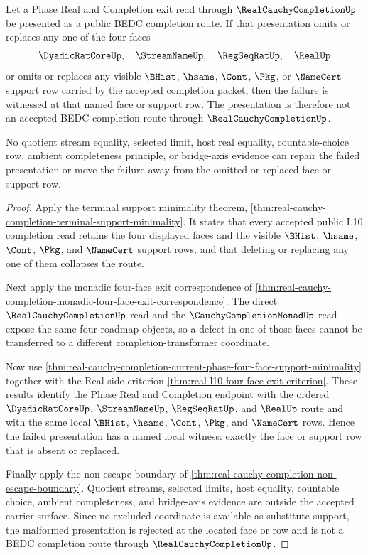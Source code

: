 \begin{theorem}
\label{thm:real-cauchy-completion-terminal-support-defect-localization}
Let a Phase Real and Completion exit read through $\RealCauchyCompletionUp$ be presented as a public BEDC completion route. If that presentation omits or replaces any one of the four faces
$$
\DyadicRatCoreUp,\quad \StreamNameUp,\quad \RegSeqRatUp,\quad \RealUp
$$
or omits or replaces any visible $\BHist$, $\hsame$, $\Cont$, $\Pkg$, or $\NameCert$ support row carried by the accepted completion packet, then the failure is witnessed at that named face or support row. The presentation is therefore not an accepted BEDC completion route through $\RealCauchyCompletionUp$.

No quotient stream equality, selected limit, host real equality, countable-choice row, ambient completeness principle, or bridge-axis evidence can repair the failed presentation or move the failure away from the omitted or replaced face or support row.
\end{theorem}
\begin{proof}
Apply the terminal support minimality theorem, \autoref{thm:real-cauchy-completion-terminal-support-minimality}. It states that every accepted public L10 completion read retains the four displayed faces and the visible $\BHist$, $\hsame$, $\Cont$, $\Pkg$, and $\NameCert$ support rows, and that deleting or replacing any one of them collapses the route.

Next apply the monadic four-face exit correspondence of \autoref{thm:real-cauchy-completion-monadic-four-face-exit-correspondence}. The direct $\RealCauchyCompletionUp$ read and the $\CauchyCompletionMonadUp$ read expose the same four roadmap objects, so a defect in one of those faces cannot be transferred to a different completion-transformer coordinate.

Now use \autoref{thm:real-cauchy-completion-current-phase-four-face-support-minimality} together with the Real-side criterion \autoref{thm:real-l10-four-face-exit-criterion}. These results identify the Phase Real and Completion endpoint with the ordered $\DyadicRatCoreUp$, $\StreamNameUp$, $\RegSeqRatUp$, and $\RealUp$ route and with the same local $\BHist$, $\hsame$, $\Cont$, $\Pkg$, and $\NameCert$ rows. Hence the failed presentation has a named local witness: exactly the face or support row that is absent or replaced.

Finally apply the non-escape boundary of \autoref{thm:real-cauchy-completion-non-escape-boundary}. Quotient streams, selected limits, host equality, countable choice, ambient completeness, and bridge-axis evidence are outside the accepted carrier surface. Since no excluded coordinate is available as substitute support, the malformed presentation is rejected at the located face or row and is not a BEDC completion route through $\RealCauchyCompletionUp$.
\end{proof}

